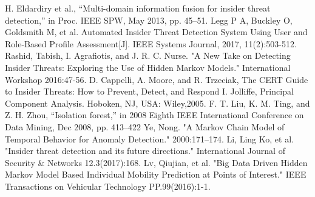 \documentclass[conference]{IEEEtran}
\begin{document}
\begin{thebibliography}{00}
 H. Eldardiry et al., “Multi-domain information fusion for insider threat detection,” in Proc. IEEE SPW, May 2013, pp. 45–51.
 Legg P A, Buckley O, Goldsmith M, et al. Automated Insider Threat Detection System Using User and Role-Based Profile Assessment[J]. IEEE Systems Journal, 2017, 11(2):503-512.
 Rashid, Tabish, I. Agrafiotis, and J. R. C. Nurse. "A New Take on Detecting Insider Threats: Exploring the Use of Hidden Markov Models." International Workshop 2016:47-56.
 D. Cappelli, A. Moore, and R. Trzeciak, The CERT Guide to Insider Threats: How to Prevent, Detect, and Respond
I. Jolliffe, Principal Component Analysis. Hoboken, NJ, USA: Wiley,2005.
F. T. Liu, K. M. Ting, and Z. H. Zhou, “Isolation forest,” in 2008 Eighth IEEE International Conference on Data Mining,
Dec 2008, pp. 413–422
 Ye, Nong. "A Markov Chain Model of Temporal Behavior for Anomaly Detection." 2000:171--174.
 Li, Ling Ko, et al. "Insider threat detection and its future directions." International Journal of Security \& Networks 12.3(2017):168.
 Lv, Qiujian, et al. "Big Data Driven Hidden Markov Model Based Individual Mobility Prediction at Points of Interest." IEEE Transactions on Vehicular Technology PP.99(2016):1-1.













\end{thebibliography}
\end{document}

